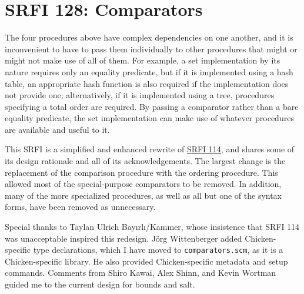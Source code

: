 \section{SRFI 128: Comparators}

The four procedures above have complex dependencies on one another, and
it is inconvenient to have to pass them individually to other procedures
that might or might not make use of all of them. For example, a set
implementation by its nature requires only an equality predicate, but if
it is implemented using a hash table, an appropriate hash function is
also required if the implementation does not provide one; alternatively,
if it is implemented using a tree, procedures specifying a total order
are required. By passing a comparator rather than a bare equality
predicate, the set implementation can make use of whatever procedures
are available and useful to it.

This SRFI is a simplified and enhanced rewrite of
\href{http://srfi.schemers.org/srfi-114/srfi-114.html}{SRFI 114}, and
shares some of its design rationale and all of its acknowledgements. The
largest change is the replacement of the comparison procedure with the
ordering procedure. This allowed most of the special-purpose comparators
to be removed. In addition, many of the more specialized procedures, as
well as all but one of the syntax forms, have been removed as
unnecessary.

Special thanks to Taylan Ulrich Bayırlı/Kammer, whose insistence that
SRFI 114 was unacceptable inspired this redesign. Jörg Wittenberger
added Chicken-specific type declarations, which I have moved to
\texttt{comparators.scm}, as it is a Chicken-specific library. He also
provided Chicken-specific metadata and setup commands. Comments from
Shiro Kawai, Alex Shinn, and Kevin Wortman guided me to the current
design for bounds and salt.